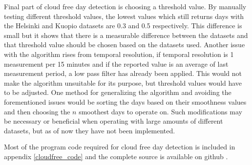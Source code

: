 Final part of cloud free day detection is choosing a threshold value. By manually testing different threshold values, the lowest values which still returns days with the Helsinki and Kuopio datasets are 0.3 and 0.5 respectively. This difference is small but it shows that there is a measurable difference between the datasets and that threshold value should be chosen based on the datasets used. Another issue with the algorithm rises from temporal resolution, if temporal resolution is 1 measurement per 15 minutes and if the reported value is an average of last measurement period, a low pass filter has already been applied. This would not make the algorithm unsuitable for its purpose, but threshold values would have to be adjusted. One method for generalizing the algorithm and avoiding the forementioned issues would be sorting the days based on their smoothness values and then choosing the $n$ smoothest days to operate on. Such modifications may be necessary or beneficial when operating with large amounts of different datasets, but as of now they have not been implemented.


Most of the program code required for cloud free day detection is included in appendix \ref{cloudfree_code} and the complete source is available on github \cite{github_source}.













